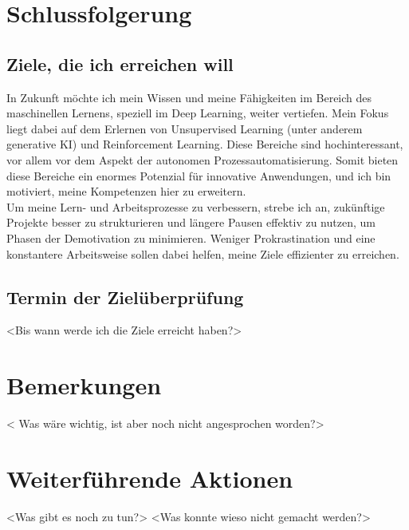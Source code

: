 \section{Schlussfolgerung}
\subsection{Ziele, die ich erreichen will}
In Zukunft möchte ich mein Wissen und meine Fähigkeiten im Bereich des maschinellen Lernens, speziell im Deep Learning, weiter vertiefen. Mein Fokus liegt dabei auf dem Erlernen von Unsupervised Learning (unter anderem generative KI) und Reinforcement Learning. Diese Bereiche sind hochinteressant, vor allem vor dem Aspekt der autonomen Prozessautomatisierung. Somit bieten diese Bereiche ein enormes Potenzial für innovative Anwendungen, und ich bin motiviert, meine Kompetenzen hier zu erweitern. 
\\
Um meine Lern- und Arbeitsprozesse zu verbessern, strebe ich an, zukünftige Projekte besser zu strukturieren und längere Pausen effektiv zu nutzen, um Phasen der Demotivation zu minimieren. Weniger Prokrastination und eine konstantere Arbeitsweise sollen dabei helfen, meine Ziele effizienter zu erreichen. 
\subsection{Termin der Zielüberprüfung}
<Bis wann werde ich die Ziele erreicht haben?>

\section{Bemerkungen}
< Was wäre wichtig, ist aber noch nicht angesprochen worden?>

\section{Weiterführende Aktionen}
<Was gibt es noch zu tun?>
<Was konnte wieso nicht gemacht werden?>

